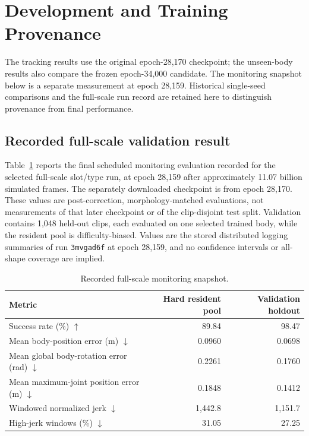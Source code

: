 \section{Development and Training Provenance}\label{app:history}
The tracking results use the original epoch-28,170 checkpoint; the unseen-body
results also compare the frozen epoch-34,000 candidate. The monitoring
snapshot below is a separate measurement at epoch 28,159. Historical
single-seed comparisons and the full-scale run record are retained here to
distinguish provenance from final performance.
\subsection{Recorded full-scale validation result}\label{sec:full_results}

Table~\ref{tab:full_results} reports the final scheduled monitoring evaluation
recorded for the selected full-scale slot/type run, at epoch 28,159 after
approximately 11.07 billion simulated frames. The separately downloaded
checkpoint is from epoch 28,170. These values are post-correction,
morphology-matched evaluations, not measurements of that later checkpoint
or of the clip-disjoint test split. Validation contains 1,048 held-out clips,
each evaluated on one selected trained body, while the resident pool is
difficulty-biased. Values are the stored distributed logging summaries of run
\texttt{3mvgad6f} at epoch 28,159, and no confidence intervals or all-shape
coverage are implied.

\begin{table}[!htb]
\centering
\small
\caption{Recorded full-scale monitoring snapshot.}\label{tab:full_results}
\begin{tabular}{lrr}
\toprule
Metric & Hard resident pool & Validation holdout \\
\midrule
Success rate (\%) $\uparrow$ & 89.84 & 98.47 \\
Mean body-position error (m) $\downarrow$ & 0.0960 & 0.0698 \\
Mean global body-rotation error (rad) $\downarrow$ & 0.2261 & 0.1760 \\
Mean maximum-joint position error (m) $\downarrow$ & 0.1848 & 0.1412 \\
Windowed normalized jerk $\downarrow$ & 1,442.8 & 1,151.7 \\
High-jerk windows (\%) $\downarrow$ & 31.05 & 27.25 \\
\bottomrule
\end{tabular}
\end{table}

